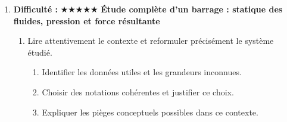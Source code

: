 \documentclass[11pt,a4paper]{article}
\newcommand{\etoiles}[1]{\textbf{Difficulté : }#1}
\begin{document}
\begin{enumerate}[label=\textbf{Très long \arabic*.},leftmargin=*]
\begin{enumerate}[label=\textbf{\arabic*)}]
\begin{enumerate}[label=\alph*)]
\end{enumerate}
\item Discuter ce qui changerait si l'on ajoutait un terme dissipatif, une résistance interne ou un changement de milieu.
\begin{enumerate}[label=\alph*)]
\item Comparer au moins deux scénarios différents.
\item Discuter la robustesse du résultat face à une variation de paramètre.
\item Proposer une ouverture vers une situation réelle plus complexe.
\end{enumerate}
\item Imaginer un protocole expérimental ou numérique permettant de confronter le modèle à des mesures.
\begin{enumerate}[label=\alph*)]
\item Comparer au moins deux scénarios différents.
\item Discuter la robustesse du résultat face à une variation de paramètre.
\item Proposer une ouverture vers une situation réelle plus complexe.
\end{enumerate}
\item Rédiger une conclusion scientifique : résultats, limites, prolongements vers la Terminale ou au-delà.
\begin{enumerate}[label=\alph*)]
\item Comparer au moins deux scénarios différents.
\item Discuter la robustesse du résultat face à une variation de paramètre.
\item Proposer une ouverture vers une situation réelle plus complexe.
\end{enumerate}
\end{enumerate}
\item \etoiles{★★★★★}
\textbf{Étude complète d'un barrage : statique des fluides, pression et force résultante}
\begin{enumerate}[label=\textbf{\arabic*)}]
\item Lire attentivement le contexte et reformuler précisément le système étudié.
\begin{enumerate}[label=\alph*)]
\item Identifier les données utiles et les grandeurs inconnues.
\item Choisir des notations cohérentes et justifier ce choix.
\item Expliquer les pièges conceptuels possibles dans ce contexte.

\end{enumerate}
\end{enumerate}
\end{enumerate}
\end{document}
